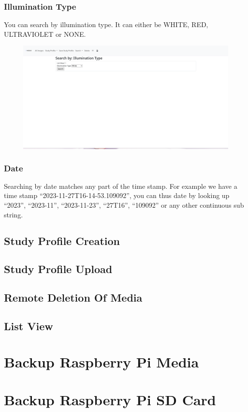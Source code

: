 \documentclass[12pt]{article}
\begin{document}
\begin{center}
	\subsubsection{Illumination Type}
	You can search by illumination type. It can either be WHITE, RED, ULTRAVIOLET or NONE.
	\begin{figure}[H]
		\includegraphics[width=\textwidth]{Figures/Search-By-Illumination-Type.png}
	\end{figure}
	\subsubsection{Date}
	Searching by date matches any part of the time stamp. For example we have a time stamp ``2023-11-27T16-14-53.109092'', you can thus date by looking up ``2023'', ``2023-11'', ``2023-11-23'', ``27T16'', ``109092'' or any other continuous sub string.
	\subsection{Study Profile Creation}
	\subsection{Study Profile Upload}
	\subsection{Remote Deletion Of Media}
	\subsection{List View}
	\section{Backup Raspberry Pi Media}
	\section{Backup Raspberry Pi SD Card}
\end{center}
\end{document}
